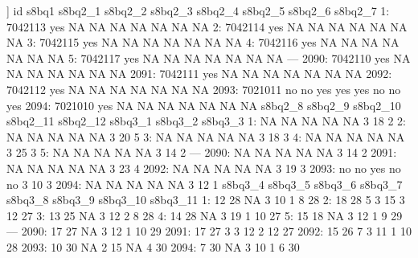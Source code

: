 \begin{Schunk}
\begin{Soutput}
[[2]]
           id s8bq1 s8bq2_1 s8bq2_2 s8bq2_3 s8bq2_4 s8bq2_5 s8bq2_6 s8bq2_7
   1: 7042113   yes      NA      NA      NA      NA      NA      NA      NA
   2: 7042114   yes      NA      NA      NA      NA      NA      NA      NA
   3: 7042115   yes      NA      NA      NA      NA      NA      NA      NA
   4: 7042116   yes      NA      NA      NA      NA      NA      NA      NA
   5: 7042117   yes      NA      NA      NA      NA      NA      NA      NA
  ---                                                                      
2090: 7042110   yes      NA      NA      NA      NA      NA      NA      NA
2091: 7042111   yes      NA      NA      NA      NA      NA      NA      NA
2092: 7042112   yes      NA      NA      NA      NA      NA      NA      NA
2093: 7021011    no      no     yes     yes     yes      no      no     yes
2094: 7021010   yes      NA      NA      NA      NA      NA      NA      NA
      s8bq2_8 s8bq2_9 s8bq2_10 s8bq2_11 s8bq2_12 s8bq3_1 s8bq3_2 s8bq3_3
   1:      NA      NA       NA       NA       NA       3      18       2
   2:      NA      NA       NA       NA       NA       3      20       5
   3:      NA      NA       NA       NA       NA       3      18       3
   4:      NA      NA       NA       NA       NA       3      25       3
   5:      NA      NA       NA       NA       NA       3      14       2
  ---                                                                   
2090:      NA      NA       NA       NA       NA       3      14       2
2091:      NA      NA       NA       NA       NA       3      23       4
2092:      NA      NA       NA       NA       NA       3      19       3
2093:      no      no      yes       no       no       3      10       3
2094:      NA      NA       NA       NA       NA       3      12       1
      s8bq3_4 s8bq3_5 s8bq3_6 s8bq3_7 s8bq3_8 s8bq3_9 s8bq3_10 s8bq3_11
   1:      12      28      NA       3      10       1        8       28
   2:      18      28       5       3      15       3       12       27
   3:      13      25      NA       3      12       2        8       28
   4:      14      28      NA       3      19       1       10       27
   5:      15      18      NA       3      12       1        9       29
  ---                                                                  
2090:      17      27      NA       3      12       1       10       29
2091:      17      27       3       3      12       2       12       27
2092:      15      26       7       3      11       1       10       28
2093:      10      30      NA       2      15      NA        4       30
2094:       7      30      NA       3      10       1        6       30

\end{Soutput}
\end{Schunk}
